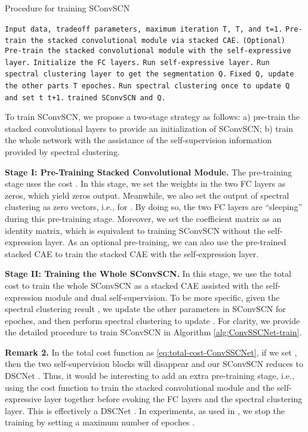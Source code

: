 \documentclass[10pt,twocolumn,letterpaper]{article}
\def\ie{i.e.}
\newcommand{\myparagraph}[1]{\smallskip\noindent\textbf{#1.}}
\def\ie{i.e.}
\begin{document}
\begin{algorithm}[tb]
\small
   \caption{Procedure for training SConvSCN}
   \label{alg:ConvSSCNet-train}
\begin{algorithmic}[1]
      \REQUIRE \texttt{Input data, tradeoff parameters, maximum iteration T, T, and t=1.} \STATE \texttt{Pre-train the stacked convolutional module via stacked CAE.} \STATE \texttt{(Optional) Pre-train the stacked convolutional module with the self-expressive layer.} \STATE \texttt{Initialize the FC layers.}
      \STATE \texttt{Run self-expressive layer.}
      \STATE \texttt{Run spectral clustering layer to get the segmentation Q.}
       \STATE \texttt{Fixed Q, update the other parts T epoches.}
      \STATE \texttt{Run spectral clustering once to update Q and set t  t+1.}
      \ENDWHILE
\ENSURE \texttt{trained SConvSCN and Q.}
\end{algorithmic}
\end{algorithm}


To train SConvSCN, we propose a two-stage strategy as follows: a) pre-train the stacked convolutional layers to provide an initialization of SConvSCN;
b) train the whole network with the assistance of the self-supervision information provided by spectral clustering.

\myparagraph{Stage I: Pre-Training Stacked Convolutional Module} The pre-training stage uses the cost . In this stage, we set the weights in the two FC layers as zeros, which yield zeros output. Meanwhile, we also set the output of spectral clustering as zero vectors, \ie,  for . By doing so, the two FC layers are ``sleeping'' during this pre-training stage.
Moreover, we set the coefficient matrix  as an identity matrix, which is equivalent to training SConvSCN without the self-expression layer. As an optional pre-training, we can also use the pre-trained stacked CAE to train the stacked CAE with the self-expression layer. 


\myparagraph{Stage II: Training the Whole SConvSCN}
In this stage, we use the total cost  to train the whole SConvSCN as a stacked CAE assisted with the self-expression module and dual self-supervision. To be more specific, given the spectral clustering result , we update the other parameters in SConvSCN for  epoches, and then perform spectral clustering to update . For clarity, we provide the detailed procedure to train SConvSCN in Algorithm \ref{alg:ConvSSCNet-train}.


\myparagraph{Remark 2} In the total cost function as \eqref{eq:total-cost-ConvSSCNet}, if we set , then the two self-supervision blocks will disappear and our SConvSCN reduces to DSCNet \cite{Ji:NIPS17}. Thus, it would be interesting to add an extra pre-training stage, \ie, using the cost function  to train the stacked convolutional module and the self-expressive layer together before evoking the FC layers and the spectral clustering layer. This is effectively a DSCNet \cite{Ji:NIPS17}.
In experiments, as used in \cite{Ji:NIPS17}, we stop the training by setting a maximum number of epoches .
\end{document}
